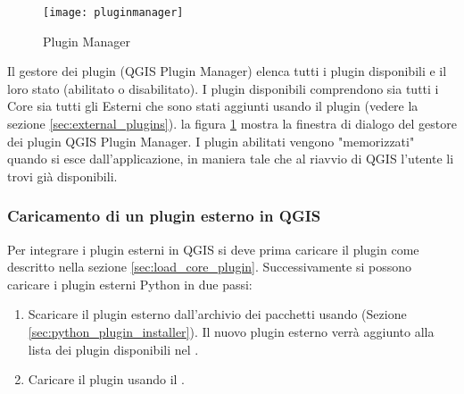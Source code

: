 \begin{figure}[ht]
   \begin{center}
   \caption{Plugin Manager \nixcaption}\label{fig:pluginmanager}\smallskip
   \texttt{[image: pluginmanager]}
\end{center}
\end{figure}

Il gestore dei plugin (QGIS Plugin Manager) elenca tutti i plugin disponibili e il loro stato (abilitato o disabilitato).
I plugin disponibili comprendono sia tutti i Core sia tutti gli Esterni che sono stati aggiunti usando il plugin  (vedere la sezione \ref{sec:external_plugins}).
la figura \ref{fig:pluginmanager} mostra la finestra di dialogo del gestore dei plugin QGIS Plugin Manager.
I plugin abilitati vengono "memorizzati" quando si esce dall'applicazione, in maniera tale che al riavvio di QGIS l'utente li trovi già disponibili.

\begin{Tip}\caption{\textsc{Blocco plugin}}
\end{Tip}

\subsubsection{Caricamento di un plugin esterno in QGIS}\label{sec:load_external_plugin} 

Per integrare i plugin esterni in QGIS si deve prima caricare il plugin  come descritto nella sezione \ref{sec:load_core_plugin}.
Successivamente si possono caricare i plugin esterni Python in due passi: 

\begin{enumerate}
\item Scaricare il plugin esterno dall'archivio dei pacchetti usando   (Sezione \ref{sec:python_plugin_installer}).
Il nuovo plugin esterno verrà aggiunto alla lista dei plugin disponibili nel .
\item Caricare il plugin usando il .
\end{enumerate}

